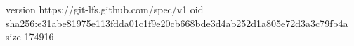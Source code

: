 version https://git-lfs.github.com/spec/v1
oid sha256:e31abe81975e113fdda01c1f9e20cb668bde3d4ab252d1a805e72d3a3c79fb4a
size 174916
